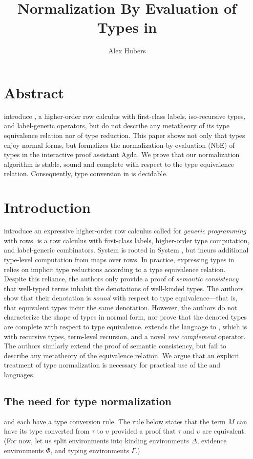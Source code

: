 \documentclass[sigplan,10pt,anonymous,review]{acmart}\settopmatter{printfolios=true,printccs=false,printacmref=false}
\title{Normalization By Evaluation of Types in \Rome}
\author{Alex Hubers}
\affiliation{
  \department{Department of Computer Science}
  \institution{The University of Iowa}
  \streetaddress{14 MacLean Hall}
  \city{Iowa City}
  \state{Iowa}
  \country{USA}}
\begin{document}
\InlineOn{}

\maketitle

\section*{Abstract}
\citet{HubersIMM24} introduce \Rome, a higher-order row calculus with first-class labels, iso-recursive types, and label-generic operators, but do not describe any metatheory of its type equivalence relation nor of type reduction. This paper shows not only that \Rome types enjoy normal forms, but formalizes the normaliz\-ation\--by\--evaluation (NbE) of types in the interactive proof assistant Agda. We prove that our normalization algorithm is stable, sound and complete with respect to the type equivalence relation. Consequently, type conversion in \Rome is decidable.

\section{Introduction}
\citet{HubersM23} introduce an expressive higher-order row calculus called \RO for \emph{generic programming} with rows. \RO is a row calculus with first-class labels, higher-order type computation, and label-generic combinators. System \RO is rooted in System \FO, but incurs additional type-level computation from maps over rows. In practice, expressing types in \RO relies on implicit type reductions according to a type equivalence relation. Despite this reliance, the authors only provide a proof of \emph{semantic consistency} that well-typed terms inhabit the denotations of well-kinded types. The authors show that their denotation is \emph{sound} with respect to type equivalence---that is, that equivalent types incur the same denotation. However, the authors do not characterize the shape of types in normal form, nor prove that the denoted types are complete with respect to type equivalence. \citet{HubersIMM24} extends the \RO language to \Rome, which is \RO with recursive types, term-level recursion, and a novel \emph{row complement} operator. The authors similarly extend the proof of semantic consistency, but fail to describe any metatheory of the equivalence relation. We argue that an explicit treatment of type normalization is necessary for practical use of the \RO and \Rome languages.

\subsection{The need for type normalization}
\label{sec:need-for-type-normalization}
\RO and \Rome each have a type conversion rule. The rule below states that the term $M$ can have its type converted from $\tau$ to $\upsilon$ provided a proof that $\tau$ and $\upsilon$ are equivalent. (For now, let us split environments into kinding environments $\Delta$, evidence environments $\Phi$, and typing environments $\Gamma$.)
\end{document}
